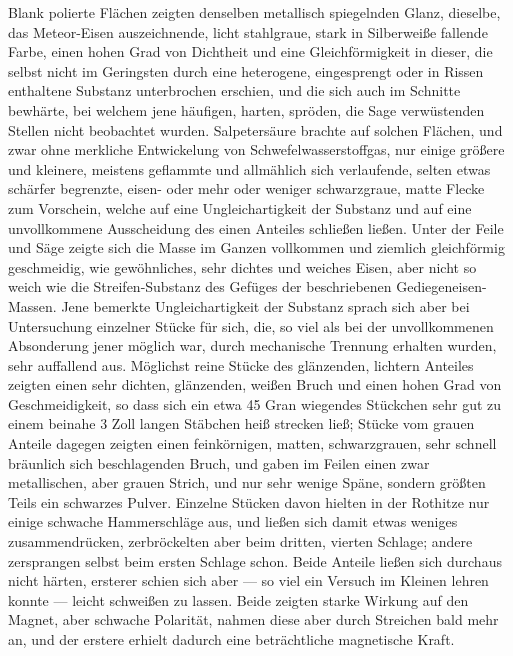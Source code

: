 \documentclass[a4paper, 11pt, oneside, german]{article}
\begin{document}
Blank polierte Flächen zeigten denselben metallisch spiegelnden Glanz, dieselbe, das Meteor-Eisen auszeichnende, licht stahlgraue, stark in Silberweiße fallende Farbe, einen hohen Grad von Dichtheit und eine Gleichförmigkeit in dieser, die selbst nicht im Geringsten durch eine heterogene, eingesprengt oder in Rissen enthaltene Substanz unterbrochen erschien, und die sich auch im Schnitte bewhärte, bei welchem jene häufigen, harten, spröden, die Sage verwüstenden Stellen nicht beobachtet wurden.  
Salpetersäure brachte auf solchen Flächen, und zwar ohne merkliche Entwickelung von Schwefelwasserstoffgas, nur einige größere und kleinere, meistens geflammte und allmählich sich verlaufende, selten etwas schärfer begrenzte, eisen- oder mehr oder weniger schwarzgraue, matte Flecke zum Vorschein, welche auf eine Ungleichartigkeit der Substanz und auf eine unvollkommene Ausscheidung des einen Anteiles schließen ließen. Unter der Feile und Säge zeigte sich die Masse im Ganzen vollkommen und ziemlich gleichförmig geschmeidig, wie gewöhnliches, sehr dichtes und weiches Eisen, aber nicht so weich wie die Streifen-Substanz des Gefüges der beschriebenen Gediegeneisen-Massen. Jene bemerkte Ungleichartigkeit der Substanz sprach sich aber bei Untersuchung einzelner Stücke für sich, die, so viel als bei der unvollkommenen Absonderung jener möglich war, durch mechanische Trennung erhalten wurden, sehr auffallend aus. Möglichst reine Stücke des glänzenden, lichtern Anteiles zeigten einen sehr dichten, glänzenden, weißen Bruch und einen hohen Grad von Geschmeidigkeit, so dass sich ein etwa 45 Gran wiegendes Stückchen sehr gut zu einem beinahe 3 Zoll langen Stäbchen heiß strecken ließ; Stücke vom grauen Anteile dagegen zeigten einen feinkörnigen, matten, schwarzgrauen, sehr schnell bräunlich sich beschlagenden Bruch, und gaben im Feilen einen zwar metallischen, aber grauen Strich, und nur sehr wenige Späne, sondern größten Teils ein schwarzes Pulver. Einzelne Stücken davon hielten in der Rothitze nur einige schwache Hammerschläge aus, und ließen sich damit etwas weniges zusammendrücken, zerbröckelten aber beim dritten, vierten Schlage; andere zersprangen selbst beim ersten Schlage schon. Beide Anteile ließen sich durchaus nicht härten, ersterer schien sich aber --- so viel ein Versuch im Kleinen lehren konnte --- leicht schweißen zu lassen. Beide zeigten starke Wirkung auf den Magnet, aber schwache Polarität, nahmen diese aber durch Streichen bald mehr an, und der erstere erhielt dadurch eine beträchtliche magnetische Kraft.  
\end{document}
